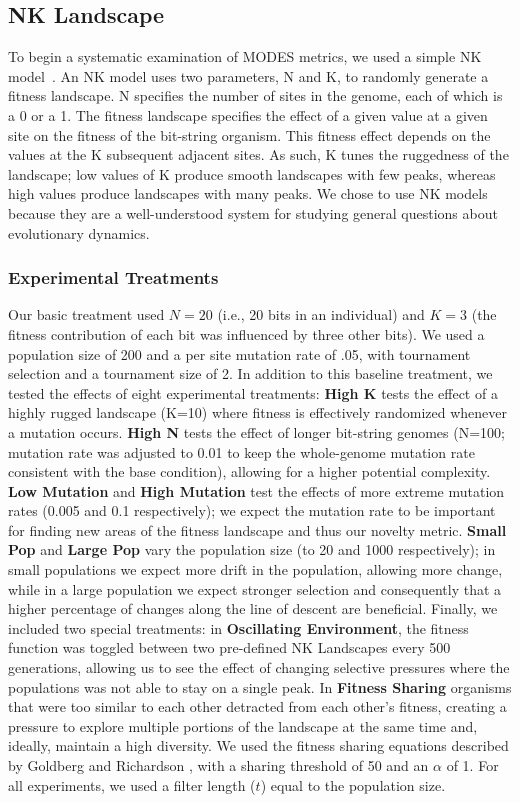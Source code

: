 \documentclass[letterpaper]{article}
\begin{document}
\subsection{NK Landscape}
To begin a systematic examination of MODES metrics, we used a simple NK model~\citep{kauffman_towards_1987}. An NK model uses two parameters, N and K, to randomly generate a fitness landscape. N specifies the number of sites in the genome, each of which is a 0 or a 1. The fitness landscape specifies the effect of a given value at a given site on the fitness of the bit-string organism. This fitness effect depends on the values at the K subsequent adjacent sites. As such, K tunes the ruggedness of the landscape; low values of K produce smooth landscapes with few peaks, whereas high values produce landscapes with many peaks. We chose to use NK models because they are a well-understood system for studying general questions about evolutionary dynamics.

\subsubsection{Experimental Treatments}
Our basic treatment used $N=20$ (i.e., 20 bits in an individual) and $K=3$ (the fitness contribution of each bit was influenced by three other bits).  We used a population size of 200 and a per site mutation rate of .05, with tournament selection and a tournament size of 2.
In addition to this baseline
treatment, we tested the effects of eight experimental treatments: \textbf{High K} tests the effect of a highly rugged landscape (K=10) where fitness is effectively randomized whenever a mutation occurs.  \textbf{High N} tests the effect of longer bit-string genomes (N=100; mutation rate was adjusted to 0.01 to keep the whole-genome mutation rate consistent with the base condition), allowing for a higher potential complexity.  \textbf{Low Mutation} and \textbf{High Mutation} test the effects of more extreme mutation rates (0.005 and 0.1 respectively); we expect the mutation rate to be important for finding new areas of the fitness landscape and thus our novelty metric.  \textbf{Small Pop} and \textbf{Large Pop} vary the population size (to 20 and 1000 respectively); in small populations we expect more drift in the population, allowing more change, while in a large population we expect stronger selection and consequently that a higher percentage of changes along the line of descent are beneficial.  Finally, we included two special treatments: in \textbf{Oscillating Environment}, the fitness function was toggled between two pre-defined NK Landscapes every 500 generations, allowing us to see the effect of changing selective pressures where the populations was not able to stay on a single peak.  In \textbf{Fitness Sharing} organisms that were too similar to each other detracted from each other's fitness, creating a pressure to explore multiple portions of the landscape at the same time and, ideally, maintain a high diversity. We used the fitness sharing equations described by Goldberg and Richardson \cite{goldberg_genetic_1987}, with a sharing threshold of 50 and an $\alpha$ of 1. For all experiments, we used a filter length ($t$) equal to the population size.
\end{document}
